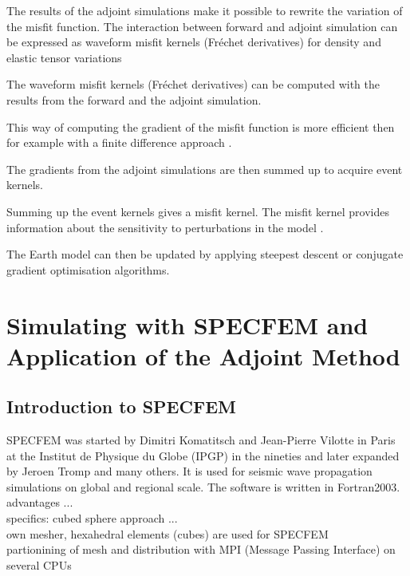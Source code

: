 The results of the adjoint simulations make it possible to rewrite the variation of the misfit function.
The interaction between forward and adjoint simulation can be expressed as waveform misfit kernels (Fr\'{e}chet derivatives)
for density and elastic tensor variations 


The waveform misfit kernels (Fr\'{e}chet derivatives) can be computed with the results from the forward and the adjoint simulation. 

This way of computing the gradient of the misfit function is more efficient then for example with a finite difference 
approach \citep{Fichtner2006a}.


 
The gradients from the adjoint simulations are then summed up to acquire event kernels. %

Summing up the event kernels gives a misfit kernel. The misfit kernel provides information about the sensitivity to perturbations in the model \citep{Magnoni2012}.

The Earth model can then be updated by applying steepest descent or conjugate gradient optimisation algorithms. 



\section{Simulating with SPECFEM and Application of the Adjoint Method}

\subsection{Introduction to SPECFEM}

SPECFEM \cite{Vilotte1998} was started by Dimitri Komatitsch and Jean-Pierre Vilotte in Paris at the Institut de Physique du Globe (IPGP) in the nineties 
and later expanded by Jeroen Tromp and many others. 
It is used for seismic wave propagation simulations on global and regional scale. 
The software is written in Fortran2003. \\
advantages ... \\
specifics: cubed sphere approach ... \\
own mesher, hexahedral elements (cubes) are used for SPECFEM \\
partionining of mesh and distribution with MPI (Message Passing Interface) on several CPUs 

